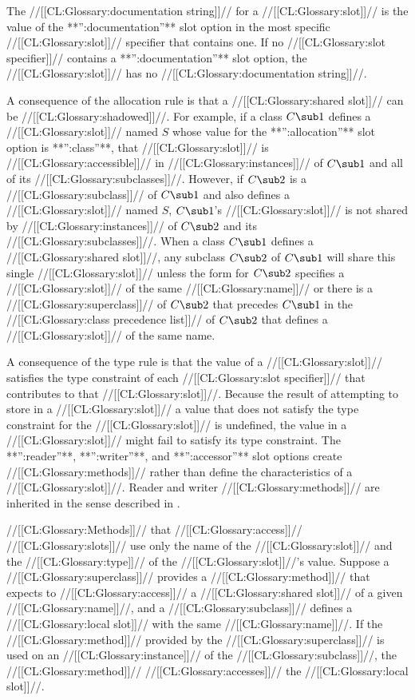 \itemitem{\bull} The //[[CL:Glossary:documentation string]]// for a //[[CL:Glossary:slot]]// is the value of the **'':documentation''** slot option in the most specific //[[CL:Glossary:slot]]// specifier that contains one.  If no //[[CL:Glossary:slot specifier]]// contains a **'':documentation''** slot option, the //[[CL:Glossary:slot]]// has no //[[CL:Glossary:documentation string]]//.

\endlist

A consequence of the allocation rule is that a //[[CL:Glossary:shared slot]]// can be //[[CL:Glossary:shadowed]]//.  For example, if a class $C\sub 1$ defines  a //[[CL:Glossary:slot]]// named $S$ whose value for the **'':allocation''** slot option is **'':class''**, that //[[CL:Glossary:slot]]// is //[[CL:Glossary:accessible]]//  in //[[CL:Glossary:instances]]// of $C\sub 1$ and all of its //[[CL:Glossary:subclasses]]//.  However, if $C\sub 2$ is a //[[CL:Glossary:subclass]]//  of $C\sub 1$ and also defines a //[[CL:Glossary:slot]]// named $S$\negthinspace, $C\sub 1$'s  //[[CL:Glossary:slot]]// is not shared by //[[CL:Glossary:instances]]// of $C\sub 2$ and its //[[CL:Glossary:subclasses]]//. When a class $C\sub 1$ defines a //[[CL:Glossary:shared slot]]//, any subclass $C\sub 2$ of $C\sub 1$ will share this single //[[CL:Glossary:slot]]//  unless the  form for $C\sub 2$ specifies a //[[CL:Glossary:slot]]// of the same  //[[CL:Glossary:name]]// or there is a //[[CL:Glossary:superclass]]// of $C\sub 2$ that precedes $C\sub 1$ in the //[[CL:Glossary:class precedence list]]// of $C\sub 2$ that defines a //[[CL:Glossary:slot]]// of the same name.

A consequence of the type rule is that the value of a //[[CL:Glossary:slot]]// satisfies the type constraint of each //[[CL:Glossary:slot specifier]]// that contributes to that //[[CL:Glossary:slot]]//.  Because the result of attempting to store in a //[[CL:Glossary:slot]]// a value that does not satisfy the type constraint for the //[[CL:Glossary:slot]]// is undefined, the value in a //[[CL:Glossary:slot]]// might fail to satisfy its type constraint.
      The **'':reader''**, **'':writer''**, and **'':accessor''** slot options create //[[CL:Glossary:methods]]// rather than define the characteristics of a //[[CL:Glossary:slot]]//. Reader and writer //[[CL:Glossary:methods]]// are inherited in the sense described in \secref\MethodInheritance.

//[[CL:Glossary:Methods]]// that //[[CL:Glossary:access]]// //[[CL:Glossary:slots]]// use only the name of the //[[CL:Glossary:slot]]// and the //[[CL:Glossary:type]]// of the //[[CL:Glossary:slot]]//'s value.  Suppose a //[[CL:Glossary:superclass]]// provides a //[[CL:Glossary:method]]// that expects to //[[CL:Glossary:access]]// a //[[CL:Glossary:shared slot]]// of a given //[[CL:Glossary:name]]//, and a //[[CL:Glossary:subclass]]// defines a //[[CL:Glossary:local slot]]// with the same //[[CL:Glossary:name]]//.  If the //[[CL:Glossary:method]]// provided  by the //[[CL:Glossary:superclass]]// is used on an //[[CL:Glossary:instance]]// of the //[[CL:Glossary:subclass]]//,  the //[[CL:Glossary:method]]// //[[CL:Glossary:accesses]]// the //[[CL:Glossary:local slot]]//.

\endsubsection%

